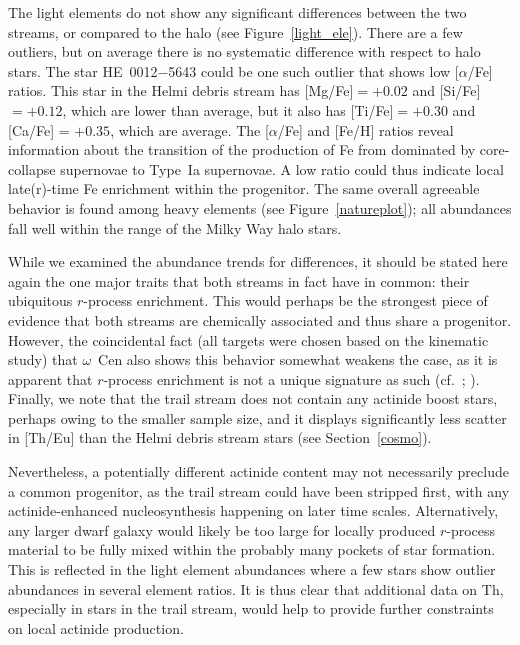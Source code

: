 \documentclass[twocolumn]{aastex63}
\begin{document}
The light elements do not show any significant differences between the two streams, or compared to the halo (see Figure~\ref{light_ele}). There are a few outliers, but on average there is no systematic difference with respect to halo stars. The star \mbox{HE~0012$-$5643} could be one such outlier that shows low [$\alpha$/Fe] ratios. This star in the Helmi debris stream has [Mg/Fe]$= +0.02$ and [Si/Fe]$= +0.12$, which are lower than average, but it also has [Ti/Fe]$= +0.30$ and [Ca/Fe] = $+0.35$, which are average. The [$\alpha$/Fe] and [Fe/H] ratios reveal information about the transition of the production of Fe from dominated by core-collapse supernovae to Type~Ia supernovae. A low ratio could thus indicate local late(r)-time Fe enrichment within the progenitor. The same overall agreeable behavior is found among heavy elements (see Figure~\ref{natureplot}); all abundances fall well within the range of the Milky Way halo stars. 


While we examined the abundance trends for differences, it should be stated here again the one major traits that both streams in fact have in common: their ubiquitous $r$-process enrichment. This would perhaps be the strongest piece of evidence that both streams are chemically associated and thus share a progenitor. However, the coincidental fact (all targets were chosen based on the \citealt{beers17} kinematic study) that $\omega$~Cen also shows this behavior somewhat weakens the case, as it is apparent that $r$-process enrichment is not a unique signature as such (cf.\ \citealt{roederer13}; \citealt{aguado21}). Finally, we note that the trail stream does not contain any actinide boost stars, perhaps owing to the smaller sample size, and it displays significantly less scatter in [Th/Eu] than the Helmi debris stream stars (see Section~\ref{cosmo}).

Nevertheless, a potentially different actinide content may not necessarily preclude a common progenitor, as the trail stream could have been stripped first, with any actinide-enhanced nucleosynthesis happening on later time scales. 
Alternatively, any larger dwarf galaxy would likely be too large for locally produced $r$-process material to be fully mixed within the probably many pockets of star formation. This is reflected in the light element abundances where a few stars show outlier abundances in several element ratios. It is thus clear that additional data on Th, especially in stars in the trail stream, would help to provide further constraints on local actinide production.
\end{document}
